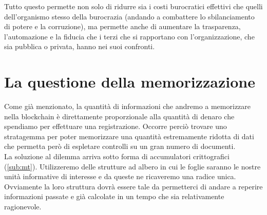 Tutto questo permette non solo di ridurre sia i costi burocratici effettivi che quelli dell'organismo
stesso della burocrazia (andando a combattere lo sbilanciamento di potere e la corruzione),
ma permette anche di aumentare la trasparenza, l'automazione e la fiducia che i terzi che si
rapportano con l'organizzazione, che sia pubblica o privata, hanno nei suoi confronti.

\section{La questione della memorizzazione}

Come già menzionato, la quantità di informazioni che andremo a memorizzare
nella blockchain è direttamente proporzionale alla quantità di denaro che
spendiamo per effettuare una registrazione.
Occorre perciò trovare uno stratagemma per poter memorizzare una quantità
estremamente ridotta di dati che permetta però di espletare controlli su un gran numero
di documenti. \\
La soluzione al dilemma arriva sotto forma di accumulatori crittografici (\autoref{sub:mt}).
Utilizzeremo delle strutture ad albero in cui le foglie saranno le nostre unità
informative di interesse e da queste ne ricaveremo una radice unica.
Ovviamente la loro struttura dovrà essere tale da permetterci di andare a reperire
informazioni passate e già calcolate in un tempo che sia relativamente ragionevole.

\newpage